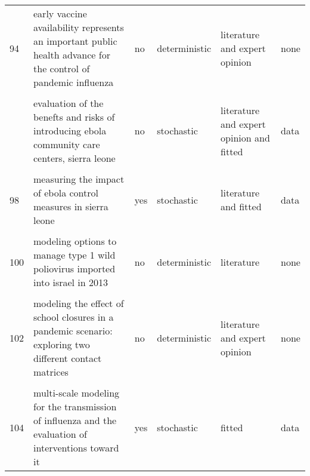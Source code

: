 \documentclass[
]{article}
\begin{document}
\begin{landscape}
\begin{longtable}{l>{\raggedright\arraybackslash}p{3cm}l>{\raggedright\arraybackslash}p{3cm}ll}
94 & early vaccine availability represents an important public health advance for the control of pandemic influenza & no & deterministic & literature and expert opinion & none\\
\cellcolor{gray!6}{95} & \cellcolor{gray!6}{effectiveness of ebola treatment units and community care centers — liberia, september 23–october 31, 2014} & \cellcolor{gray!6}{no} & \cellcolor{gray!6}{deterministic} & \cellcolor{gray!6}{literature and fitted} & \cellcolor{gray!6}{data}\\
\addlinespace
96 & evaluation of the benefts and risks of introducing ebola community care centers, sierra leone & no & stochastic & literature and expert opinion and fitted & data\\
\cellcolor{gray!6}{97} & \cellcolor{gray!6}{evidence for emergency vaccination having played a crucial role to control the 1965/66 foot-and-mouth disease outbreak in switzerland} & \cellcolor{gray!6}{yes} & \cellcolor{gray!6}{stochastic} & \cellcolor{gray!6}{literature and expert opinion} & \cellcolor{gray!6}{data}\\
98 & measuring the impact of ebola control measures in sierra leone & yes & stochastic & literature and fitted & data\\
\cellcolor{gray!6}{99} & \cellcolor{gray!6}{media impact switching surface during an infectious disease outbreak} & \cellcolor{gray!6}{no} & \cellcolor{gray!6}{deterministic} & \cellcolor{gray!6}{literature and fitted} & \cellcolor{gray!6}{data}\\
100 & modeling options to manage type 1 wild poliovirus imported into israel in 2013 & no & deterministic & literature & none\\
\addlinespace
\cellcolor{gray!6}{101} & \cellcolor{gray!6}{modeling the effect of comprehensive interventions on ebola virus transmission} & \cellcolor{gray!6}{no} & \cellcolor{gray!6}{deterministic} & \cellcolor{gray!6}{literature and fitted} & \cellcolor{gray!6}{data}\\
102 & modeling the effect of school closures in a pandemic scenario: exploring two different contact matrices & no & deterministic & literature and expert opinion & none\\
\cellcolor{gray!6}{103} & \cellcolor{gray!6}{modelling the effect of early detection of ebola} & \cellcolor{gray!6}{no} & \cellcolor{gray!6}{deterministic} & \cellcolor{gray!6}{literature and expert opinion} & \cellcolor{gray!6}{none}\\
104 & multi-scale modeling for the transmission of influenza and the evaluation of interventions toward it & yes & stochastic & fitted & data\\

\end{longtable}
\end{landscape}
\end{document}
